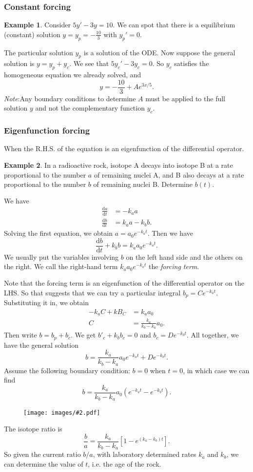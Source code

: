 \documentclass[a4paper]{article}
\theoremstyle{definition}
\newtheorem*{eg}{Example}
\newcommand{\note}{\noindent \emph{Note}:\;}
\renewcommand{\d}{\mathrm{d}}
\newcommand{\img}[2][]{\begin{figure}[ht]\centering\texttt{[image: images/\#2.pdf]}\end{figure}}
\begin{document}
\subsubsection{Constant forcing}
\begin{eg}
  Consider $5y' - 3y = 10$. We can spot that there is a equilibrium (constant) solution $y = y_p = -\frac{10}{3}$ with $y_p' = 0$.
  
  The particular solution $y_p$ is a solution of the ODE. Now suppose the general solution is $y = y_p + y_c$. We see that $5y_c' - 3y_c = 0$. So $y_c$ satisfies the homogeneous equation we already solved, and
  \[
  y = -\frac{10}{3} + Ae^{3x/5}.
  \]
  \note Any boundary conditions to determine $A$ must be applied to the full solution $y$ and not the complementary function $y_c$. 
\end{eg}
\subsubsection{Eigenfunction forcing}
When the R.H.S. of the equation is an eigenfunction of the differential operator.
\begin{eg}
  In a radioactive rock, isotope A decays into isotope B at a rate proportional to the number $a$ of remaining nuclei A, and B also decays at a rate proportional to the number $b$ of remaining nuclei B. Determine $b(t)$.

  We have
  \begin{align*}
    \frac{\d a}{\d t} &= -k_a a\\
    \frac{\d b}{\d t} &= k_a a - k_b b.
  \end{align*}
  Solving the first equation, we obtain $a = a_0e^{-k_at}$. Then we have
  \[
  \frac{\d b}{\d t} + k_b b = k_aa_0e^{-k_at}.
  \]
  We usually put the variables involving $b$ on the left hand side and the others on the right. We call the right-hand term $k_aa_0e^{-k_at}$ the \emph{forcing term}.

  Note that the forcing term is an eigenfunction of the differential operator on the LHS. So that suggests that we can try a particular integral $b_p = Ce^{-k_at}$. Substituting it in, we obtain
  \begin{align*}
    -k_aC + kB_C &= k_a a_0\\
    C &= \frac{k_a}{k_b - k_a}a_0.
  \end{align*}
  Then write $b = b_p + b_c$. We get $b'_c + k_bb_c = 0$ and $b_c = De^{-k_bt}$. All together, we have the general solution
  \[
  b = \frac{k_a}{k_b - k_a}a_0 e^{-k_at} + De^{-k_bt}.
  \]
  Assume the following boundary condition: $b = 0$ when $t = 0$, in which case we can find 
  \[
  b = \frac{k_a}{k_b - k_a}a_0\left(e^{-k_at} - e^{-k_bt}\right).
  \]
  \img{de_4}

  The isotope ratio is
  \[
  \frac{b}{a} = \frac{k_a}{k_b - k_a}\left[1 - e^{(k_a - k_b)t}\right].
  \]
  So given the current ratio $b/a$, with laboratory determined rates $k_a$ and $k_b$, we can determine the value of $t$, i.e. the age of the rock.
\end{eg}
\end{document}
